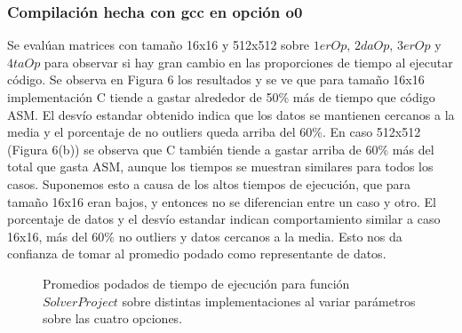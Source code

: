 \subsubsection{Compilación hecha con gcc en opción o0} 
Se evalúan matrices con tamaño 16x16 y 512x512 sobre $1erOp$, $2daOp$, $3erOp$ y $4taOp$ para observar si hay gran cambio en las proporciones de tiempo al ejecutar código. Se observa en Figura 6 los resultados y se ve que para tamaño 16x16 implementación C tiende a gastar alrededor de 50$\%$ más de tiempo que código ASM.
El desvío estandar obtenido indica que los datos se mantienen cercanos a la media y el porcentaje de no outliers queda arriba del 60$\%$. En caso 512x512 (Figura 6(b)) se observa que C también tiende a gastar arriba de 60$\%$ más del total que gasta ASM, aunque los tiempos se muestran similares para todos los casos. Suponemos esto a causa de los altos tiempos de ejecución, que para tamaño 16x16 eran bajos, y entonces no se diferencian entre un caso y otro. El porcentaje de datos y el desvío estandar indican comportamiento similar a caso 16x16, más del 60$\%$ no outliers y datos cercanos a la media. Esto nos da confianza de tomar al promedio podado como representante de datos.
  
 \begin{figure}[htbp]
\centering


\caption{Promedios podados de tiempo de ejecución para función $Solver Project$ sobre distintas implementaciones al variar parámetros sobre las cuatro opciones.} \label{fig:lego}
\end{figure}

